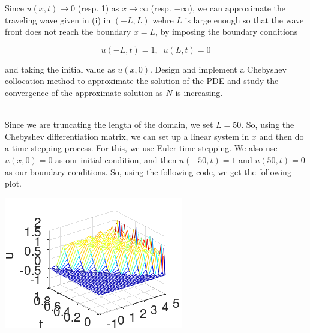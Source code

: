 Since $u(x,t)\to0$ (resp. 1) as $x\to\infty$ (resp. $-\infty$), we can approximate the traveling
wave given in (i) in $(-L,L)$ wehre $L$ is large enough so that the wave front does not reach the
boundary $x=L$, by imposing the boundary conditions

$$u(-L,t) = 1,\;\;u(L,t) = 0$$

and taking the initial value as $u(x,0)$. Design and implement a Chebyshev collocation method to
approximate the solution of the PDE and study the convergence of the approximate solution as $N$ is
increasing.\\

\begin{solution}\renewcommand{\qedsymbol}{}\ \\
    Since we are truncating the length of the domain, we set $L=50$. So, using the Chebyshev
    differentiation matrix, we can set up a linear system in $x$ and then do a time stepping process.
    For this, we use Euler time stepping. We also use $u(x,0)=0$ as our initial condition,
    and then $u(-50,t)=1$ and $u(50,t)=0$ as our boundary conditions. So, using the following code, we
    get the following plot.

    \begin{center}
        \includegraphics[scale=1]{problem2ii.PNG}
    \end{center}

\end{solution}

\newpage

\newpage